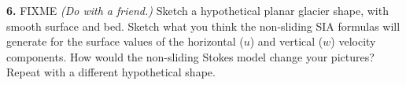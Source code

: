 \documentclass[12pt]{amsart}
\newcommand{\prob}[1]{\bigskip\noindent\textbf{#1.}\quad }
\begin{document}
\prob{6}  FIXME \emph{(Do with a friend.)}  Sketch a hypothetical planar glacier shape, with smooth surface and bed.  Sketch what you think the non-sliding SIA formulas will generate for the surface values of the horizontal ($u$) and vertical ($w$) velocity components.  How would the non-sliding Stokes model change your pictures?  Repeat with a different hypothetical shape.
\end{document}
